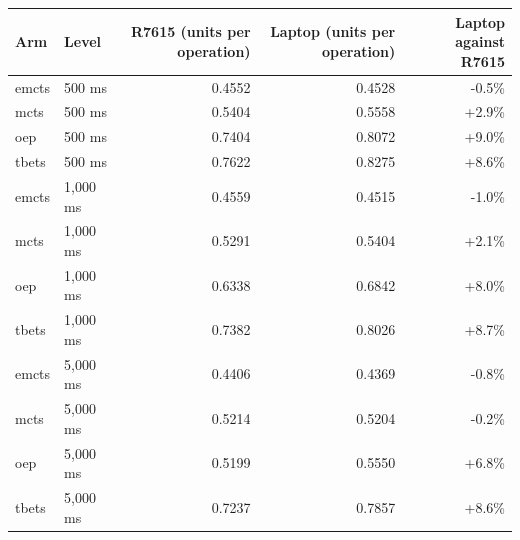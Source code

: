 \begin{tabular}{llrrr}
\toprule
Arm & Level & R7615 (units per operation) & Laptop (units per operation) & Laptop against R7615 \\
\midrule
emcts & 500 ms & 0.4552 & 0.4528 & -0.5\% \\
mcts & 500 ms & 0.5404 & 0.5558 & +2.9\% \\
oep & 500 ms & 0.7404 & 0.8072 & +9.0\% \\
tbets & 500 ms & 0.7622 & 0.8275 & +8.6\% \\
emcts & 1,000 ms & 0.4559 & 0.4515 & -1.0\% \\
mcts & 1,000 ms & 0.5291 & 0.5404 & +2.1\% \\
oep & 1,000 ms & 0.6338 & 0.6842 & +8.0\% \\
tbets & 1,000 ms & 0.7382 & 0.8026 & +8.7\% \\
emcts & 5,000 ms & 0.4406 & 0.4369 & -0.8\% \\
mcts & 5,000 ms & 0.5214 & 0.5204 & -0.2\% \\
oep & 5,000 ms & 0.5199 & 0.5550 & +6.8\% \\
tbets & 5,000 ms & 0.7237 & 0.7857 & +8.6\% \\
\bottomrule
\end{tabular}
